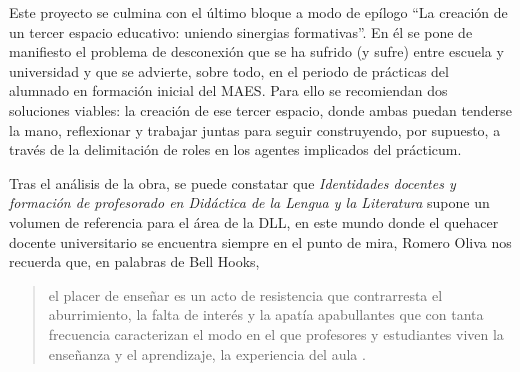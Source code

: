 \documentclass[spanish]{textolivre}
\begin{document}
Este proyecto se culmina con el último bloque a modo de epílogo “La creación de un tercer espacio educativo: uniendo sinergias formativas”. En él se pone de manifiesto el problema de desconexión que se ha sufrido (y sufre) entre escuela y universidad y que se advierte, sobre todo, en el periodo de prácticas del alumnado en formación inicial del MAES. Para ello se recomiendan dos soluciones viables: la creación de ese tercer espacio, donde ambas puedan tenderse la mano, reflexionar y trabajar juntas para seguir construyendo, por supuesto, a través de la delimitación de roles en los agentes implicados del prácticum.

Tras el análisis de la obra, se puede constatar que \textit{Identidades docentes y formación de profesorado en Didáctica de la Lengua y la Literatura} supone un volumen de referencia para el área de la DLL, en este mundo donde el quehacer docente universitario se encuentra siempre en el punto de mira, Romero Oliva nos recuerda que, en palabras de Bell Hooks,

\begin{quote}
    el placer de enseñar es un acto de resistencia que contrarresta el aburrimiento, la falta de interés y la apatía apabullantes que con tanta frecuencia caracterizan el modo en el que profesores y estudiantes viven la enseñanza y el aprendizaje, la experiencia del aula \cite[p. 32]{hooks_ensenar_2021}.
\end{quote}

\printbibliography\label{sec-bib}
\end{document}
